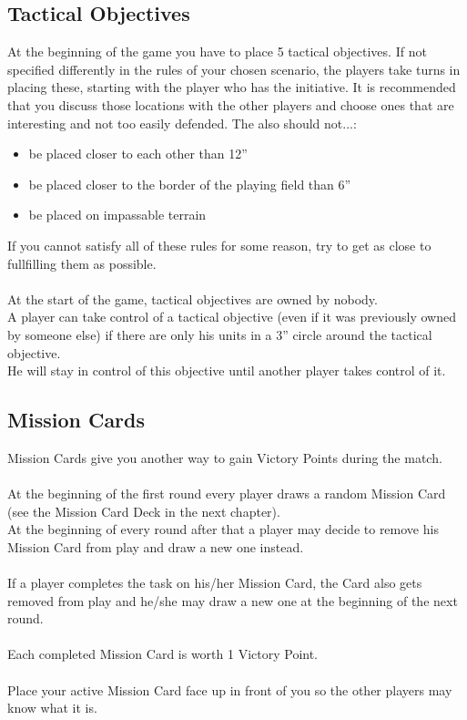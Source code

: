 \documentclass[
	11pt,
	toc=bibliography
	]{article}
\begin{document}
\subsection{Tactical Objectives}
At the beginning of the game you have to place 5 tactical objectives. If not specified differently in the rules of your chosen scenario, the players take turns in placing these, starting with the player who has the initiative. It is recommended that you discuss those locations with the other players and choose ones that are interesting and not too easily defended. The also should not...:
\begin{itemize}
\item be placed closer to each other than 12''
\item be placed closer to the border of the playing field than 6''
\item be placed on impassable terrain
\end{itemize}
If you cannot satisfy all of these rules for some reason, try to get as close to fullfilling them as possible.\\\\
At the start of the game, tactical objectives are owned by nobody. \\
A player can take control of a tactical objective (even if it was previously owned by someone else) if there are only his units in a 3'' circle around the tactical objective.\\
He will stay in control of this objective until another player takes control of it.
\subsection{Mission Cards}
Mission Cards give you another way to gain Victory Points during the match.\\\\
At the beginning of the first round every player draws a random Mission Card (see the Mission Card Deck in the next chapter).\\
At the beginning of every round after that a player may decide to remove his Mission Card from play and draw a new one instead.\\\\
If a player completes the task on his/her Mission Card, the Card also gets removed from play and he/she may draw a new one at the beginning of the next round.\\\\
Each completed Mission Card is worth 1 Victory Point.\\\\
Place your active Mission Card face up in front of you so the other players may know what it is.
\end{document}
